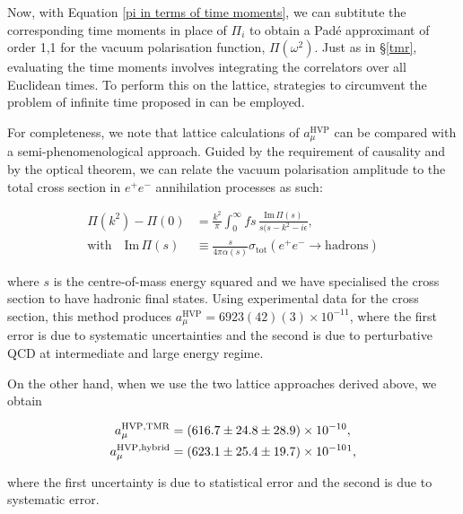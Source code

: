 \documentclass{article}
\numberwithin{equation}{section} %
\begin{document}
Now, with Equation \ref{pi in terms of time moments}, we can subtitute the corresponding time moments in place of $\Pi_i$ to obtain a Pad\'e approximant of order 1,1 for the vacuum polarisation function, $\Pi(\omega^2)$. Just as in \S \ref{tmr}, evaluating the time moments involves integrating the correlators over all Euclidean times. To perform this on the lattice, strategies to circumvent the problem of infinite time proposed in \cite{dellamorte} can be employed.

For completeness, we note that lattice calculations of $a_\mu^\mathrm{HVP}$ can be compared with a semi-phenomenological approach. Guided by the requirement of causality\cite{lehnerg2} and by the optical theorem\cite{jackson}, we can relate the vacuum polarisation amplitude to the total cross section in $e^+e^-$ annihilation processes as such:

\begin{equation}
\begin{split}
\Pi(k^2) - \Pi(0) &= \frac{k^2}{\pi}\int^\infty_0 fs\, \frac{\mathrm{Im}\, \Pi(s)}{s(s-k^2-i\epsilon},\\
\mathrm{with} \quad\mathrm{Im} \, \Pi(s) &\equiv \frac{s}{4\pi\alpha(s)}\sigma_\mathrm{tot}(e^+e^-\rightarrow \mathrm{hadrons})
\end{split}
\end{equation}

\noindent where $s$ is the centre-of-mass energy squared and we have specialised the cross section to have hadronic final states. Using experimental data for the cross section, this method produces $a_\mu^\mathrm{HVP}=6923(42)(3)\times 10^{-11}$, where the first error is due to systematic uncertainties and the second is due to perturbative QCD at intermediate and large energy regime\cite{hoecker}.

On the other hand, when we use the two lattice approaches derived above, we obtain\cite{dellamorte}

\begin{equation}
\begin{split}
a_\mu^\mathrm{HVP,TMR} &= (616.7 \pm 24.8 \pm 28.9) \times 10^{-10} ,\\
a_\mu^\mathrm{HVP,hybrid}&= (623.1 \pm 25.4 \pm 19.7) \times 10^{-10}\footnotemark , 
\end{split}
\end{equation}

\noindent where the first uncertainty is due to statistical error and the second is due to systematic error. 
\end{document}

